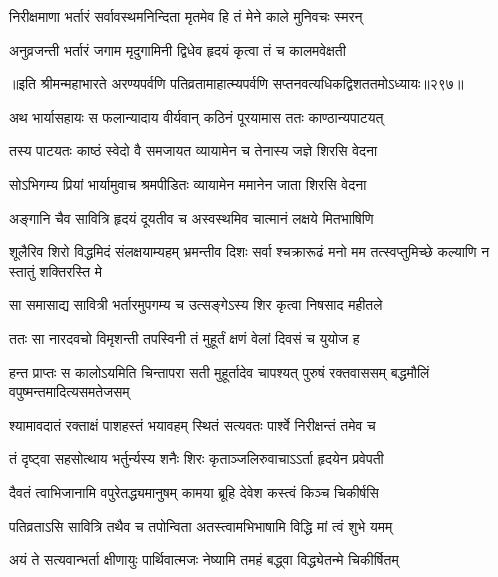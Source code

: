 \begin{center}
\twolineshloka
{निरीक्षमाणा भर्तारं सर्वावस्थमनिन्दिता}
{मृतमेव हि तं मेने काले मुनिवचः स्मरन्}


\twolineshloka
{अनुव्रजन्ती भर्तारं जगाम मृदुगामिनी}
{द्विधेव हृदयं कृत्वा तं च कालमवेक्षती}


॥इति श्रीमन्महाभारते अरण्यपर्वणि
पतिव्रतामाहात्म्यपर्वणि सप्तनवत्यधिकद्विशततमोऽध्यायः॥२९७॥




\twolineshloka
{अथ भार्यासहायः स फलान्यादाय वीर्यवान्}
{कठिनं पूरयामास ततः काण्ठान्यपाटयत्}


\twolineshloka
{तस्य पाटयतः काष्ठं स्वेदो वै समजायत}
{व्यायामेन च तेनास्य जज्ञे शिरसि वेदना}


\twolineshloka
{सोऽभिगम्य प्रियां भार्यामुवाच श्रमपीडितः}
{व्यायामेन ममानेन जाता शिरसि वेदना}


\twolineshloka
{अङ्गानि चैव सावित्रि हृदयं दूयतीव च}
{अस्वस्थमिव चात्मानं लक्षये मितभाषिणि}


\threelineshloka
{शूलैरिव शिरो विद्धमिदं संलक्षयाम्यहम्}
{भ्रमन्तीव दिशः सर्वा श्चक्रारूढं मनो मम}
{तत्स्वप्तुमिच्छे कल्याणि न स्तातुं शक्तिरस्ति मे}


\twolineshloka
{सा समासाद्य सावित्री भर्तारमुपगम्य च}
{उत्सङ्गेऽस्य शिर कृत्वा निषसाद महीतले}


\twolineshloka
{ततः सा नारदवचो विमृशन्ती तपस्विनी}
{तं मुहूर्तं क्षणं वेलां दिवसं च युयोज ह}


\threelineshloka
{हन्त प्राप्तः स कालोऽयमिति चिन्तापरा सती}
{मुहूर्तादेव चापश्यत् पुरुषं रक्तवाससम्}
{बद्धमौलिं वपुष्मन्तमादित्यसमतेजसम्}


\twolineshloka
{श्यामावदातं रक्ताक्षं पाशहस्तं भयावहम्}
{स्थितं सत्यवतः पार्श्वे निरीक्षन्तं तमेव च}


\twolineshloka
{तं दृष्ट्वा सहसोत्थाय भर्तुर्न्यस्य शनैः शिरः}
{कृताञ्जलिरुवाचाऽऽर्ता हृदयेन प्रवेपती}


\twolineshloka
{दैवतं त्वाभिजानामि वपुरेतद्ध्यमानुषम्}
{कामया ब्रूहि देवेश कस्त्वं किञ्च चिकीर्षसि}




\twolineshloka
{पतिव्रताऽसि सावित्रि तथैव च तपोन्विता}
{अतस्त्वामभिभाषामि विद्धि मां त्वं शुभे यमम्}


\twolineshloka
{अयं ते सत्यवान्भर्ता क्षीणायुः पार्थिवात्मजः}
{नेष्यामि तमहं बद्ध्वा विद्ध्येतन्मे चिकीर्षितम्}





\end{center}

